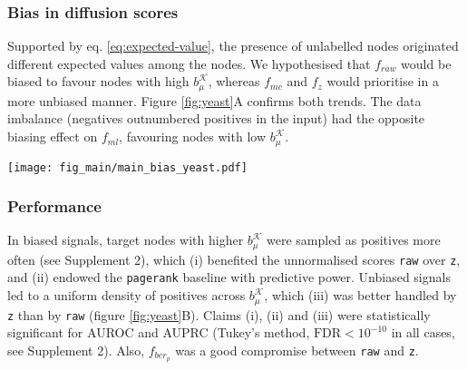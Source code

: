 \documentclass[final]{bioinfo}
\newcommand{\method}{\texttt}
\newcommand{\ebias}{b_{\mu}^{\mathcal{K}}}
\begin{document}
\subsubsection*{Bias in diffusion scores}

Supported by eq. \ref{eq:expected-value}, the presence of unlabelled nodes originated different expected values among the nodes. 
We hypothesised that $f_{raw}$ would be biased to favour nodes with high $\ebias$, whereas $f_{mc}$ and $f_z$ would prioritise in a more unbiased manner. 
Figure \ref{fig:yeast}A confirms both trends. 
The data imbalance (negatives outnumbered positives in the input) had the opposite biasing effect on $f_{ml}$, favouring nodes with low $\ebias$.

\begin{figure*}[!tpb]%
\centerline{
\texttt{[image: fig\_main/main\_bias\_yeast.pdf]}
}
\caption{Analysis of biased and unbiased synthetic signals on the yeast network. 
Nodes showed a mean value-related bias, see Supplement 2.
\textbf{(A)} Effects of the mean value bias in on the average node ranking, under biased and unbiased signals. 
Lines correspond to Generalised Additive Models with $y \sim s(x, bs = "cs")$ and 0.95 confidence intervals.
\method{raw} and \method{ml} tended to find positives with high and low $\ebias$,  respectively. 
\method{z} found positives in a more uniform manner.
\textbf{(B)} Performance in terms of AUROC and AUPRC.
The lower and the higher hinges represent the first and third quartiles, with the median indicated by the intermediate bar. 
The whiskers extend up to 1.5 times the interquantile range from the box, whereas more distant data points are displayed as outliers.
\method{raw} was better suited for biased signals, for which the \method{pagerank} baseline also outperformed a random predictor. 
Conversely, \method{z} worked best on unbiased signals. 
}
\label{fig:yeast}
\end{figure*}

\subsubsection*{Performance}

In biased signals, target nodes with higher $\ebias$ were sampled as positives more often (see Supplement 2), which (i) benefited the unnormalised scores \method{raw} over \method{z}, and (ii) endowed the \method{pagerank} baseline with predictive power.
Unbiased signals led to a uniform density of positives across $\ebias$, which (iii) was better handled by \method{z} than by \method{raw} (figure \ref{fig:yeast}B). 
Claims (i), (ii) and (iii) were statistically significant for AUROC and AUPRC (Tukey's method, $\textrm{FDR}<10^{-10}$ in all cases, see Supplement 2).
Also, $f_{ber_p}$ was a good compromise between \method{raw} and \method{z}.
\end{document}
